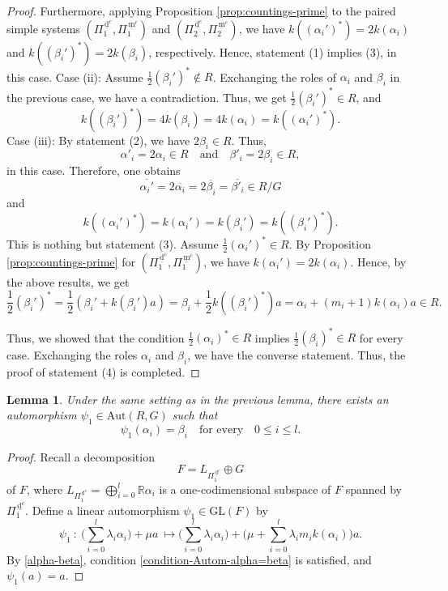 \documentclass[11pt]{amsart}
\newcommand{\R}{\mathbb{R}}
\newcommand{\Aut}{\mathrm{Aut}}
\newcommand{\dc}{\,\underline{\mathrm{d}}^c}
\newcommand{\mc}{\, \underline{\mathrm{m}}^c}
\newtheorem{lemma}[thm]{Lemma}%
\begin{document}
{\begin{proof}
Furthermore,  applying Proposition \ref{prop:countings-prime} to the paired 
simple systems $(\Pi_1^{\dc},\Pi_1^{\mc})$ and $(\Pi_2^{\dc},\Pi_2^{\mc})$, we have
$k((\alpha_i')^\ast)=2k(\alpha_i)$ and $k((\beta_i')^\ast)=2k(\beta_i)$, respectively.
Hence, statement (1) implies (3), in this case.
\vskip 3mm
\noindent
Case (ii): Assume $\frac12 (\beta_i')^\ast\not\in R$. 
Exchanging the roles of
$\alpha_i$ and $\beta_i$ in the previous case, we have a contradiction. 
Thus, we get $\frac12 (\beta_i')^\ast\in R$, and 
\[k((\beta_i')^\ast)=4k(\beta_i)=4k(\alpha_i)=k((\alpha_i')^\ast).\]
Case (iii): By statement (2), we have $2\beta_i\in R$. Thus, 
\[\alpha'_i=2\alpha_i\in R\quad\text{and}\quad \beta'_i=2\beta_i\in R,\]
in this case.  Therefore, one obtains
\[\overline{\alpha_i'}=2\overline{\alpha_i}=2\overline{\beta_i}
=\overline{\beta'_i}\in R/G\]
and  
\[k((\alpha_i')^\ast)=k(\alpha_i')=k(\beta_i')=k((\beta_i')^\ast).\]
This is nothing but statement (3). 
Assume $\frac12 (\alpha_i')^\ast\in R$. By Proposition \ref{prop:countings-prime} 
for $(\Pi_1^{\dc},\Pi_1^{\mc})$, we have $k(\alpha_i')=2k(\alpha_i)$. 
Hence, by the above results, we get  
\[\frac12 (\beta_i')^\ast=\frac12\left(\beta_i'+k(\beta_i')a\right)
=\beta_i+\frac12k((\beta_i')^\ast)a=\alpha_i+(m_i+1)k(\alpha_i)a \in R.\]


Thus, we showed that the condition $\frac12 (\alpha_i)^\ast\in R$ implies
$\frac12 (\beta_i)^\ast\in R$ for every case. 
Exchanging
 the roles $\alpha_i$ and $\beta_i$, we have the 
converse
statement. Thus, the proof of statement (4) is completed.  
\end{proof}

\begin{lemma}\label{lemma:nr-counting-Autom4}
Under the same setting 
as in
the previous lemma, 
there exists an automorphism $\psi_1\in \Aut(R,G)$ such that 
\begin{equation}\label{condition-Autom-alpha=beta}
\psi_1(\alpha_i)=\beta_i\quad\text{for every}\quad 0\leq i\leq l.
\end{equation} 
\end{lemma}
\begin{proof}
Recall a decomposition 
\begin{equation}\label{decomp_F-Pi_1}
F=L_{\Pi_1^{\dc}}\oplus G
\end{equation} 
of $F$, where $L_{\Pi_1^{\dc}}=\bigoplus_{i=0}^l\R\alpha_i$ is a one-codimensional 
subspace of $F$ spanned by $\Pi_1^{\dc}$. Define a linear automorphism 
$\psi_1\in\mathrm{GL}(F)$ by
\[\psi_1\ :\ \Big(\sum_{i=0}^l \lambda_i\alpha_i\Big)+\mu a\ \longmapsto
\Big(\sum_{i=0}^l \lambda_i\alpha_i\Big)+\Big(\mu+\sum_{i=0}^l \lambda_i m_i
k(\alpha_i)\Big)a.\]
By \eqref{alpha-beta},
condition \eqref{condition-Autom-alpha=beta} is 
satisfied, and $\psi_1(a)=a$. 


\end{proof}}
\end{document}
